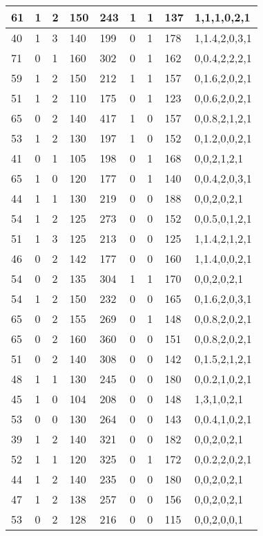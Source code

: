 \documentclass{article}
\begin{document}
\begin{table}[h!]
\begin{tabular}{|l|l|l|l|l|l|l|l|l|}
61 & 1 & 2 & 150 & 243 & 1 & 1 & 137 & 1,1,1,0,2,1 \\ \hline
40 & 1 & 3 & 140 & 199 & 0 & 1 & 178 & 1,1.4,2,0,3,1 \\ \hline
71 & 0 & 1 & 160 & 302 & 0 & 1 & 162 & 0,0.4,2,2,2,1 \\ \hline
59 & 1 & 2 & 150 & 212 & 1 & 1 & 157 & 0,1.6,2,0,2,1 \\ \hline
51 & 1 & 2 & 110 & 175 & 0 & 1 & 123 & 0,0.6,2,0,2,1 \\ \hline
65 & 0 & 2 & 140 & 417 & 1 & 0 & 157 & 0,0.8,2,1,2,1 \\ \hline
53 & 1 & 2 & 130 & 197 & 1 & 0 & 152 & 0,1.2,0,0,2,1 \\ \hline
41 & 0 & 1 & 105 & 198 & 0 & 1 & 168 & 0,0,2,1,2,1 \\ \hline
65 & 1 & 0 & 120 & 177 & 0 & 1 & 140 & 0,0.4,2,0,3,1 \\ \hline
44 & 1 & 1 & 130 & 219 & 0 & 0 & 188 & 0,0,2,0,2,1 \\ \hline
54 & 1 & 2 & 125 & 273 & 0 & 0 & 152 & 0,0.5,0,1,2,1 \\ \hline
51 & 1 & 3 & 125 & 213 & 0 & 0 & 125 & 1,1.4,2,1,2,1 \\ \hline
46 & 0 & 2 & 142 & 177 & 0 & 0 & 160 & 1,1.4,0,0,2,1 \\ \hline
54 & 0 & 2 & 135 & 304 & 1 & 1 & 170 & 0,0,2,0,2,1 \\ \hline
54 & 1 & 2 & 150 & 232 & 0 & 0 & 165 & 0,1.6,2,0,3,1 \\ \hline
65 & 0 & 2 & 155 & 269 & 0 & 1 & 148 & 0,0.8,2,0,2,1 \\ \hline
65 & 0 & 2 & 160 & 360 & 0 & 0 & 151 & 0,0.8,2,0,2,1 \\ \hline
51 & 0 & 2 & 140 & 308 & 0 & 0 & 142 & 0,1.5,2,1,2,1 \\ \hline
48 & 1 & 1 & 130 & 245 & 0 & 0 & 180 & 0,0.2,1,0,2,1 \\ \hline
45 & 1 & 0 & 104 & 208 & 0 & 0 & 148 & 1,3,1,0,2,1 \\ \hline
53 & 0 & 0 & 130 & 264 & 0 & 0 & 143 & 0,0.4,1,0,2,1 \\ \hline
39 & 1 & 2 & 140 & 321 & 0 & 0 & 182 & 0,0,2,0,2,1 \\ \hline
52 & 1 & 1 & 120 & 325 & 0 & 1 & 172 & 0,0.2,2,0,2,1 \\ \hline
44 & 1 & 2 & 140 & 235 & 0 & 0 & 180 & 0,0,2,0,2,1 \\ \hline
47 & 1 & 2 & 138 & 257 & 0 & 0 & 156 & 0,0,2,0,2,1 \\ \hline
53 & 0 & 2 & 128 & 216 & 0 & 0 & 115 & 0,0,2,0,0,1 \\ \hline

\end{tabular}
\end{table}
\end{document}
